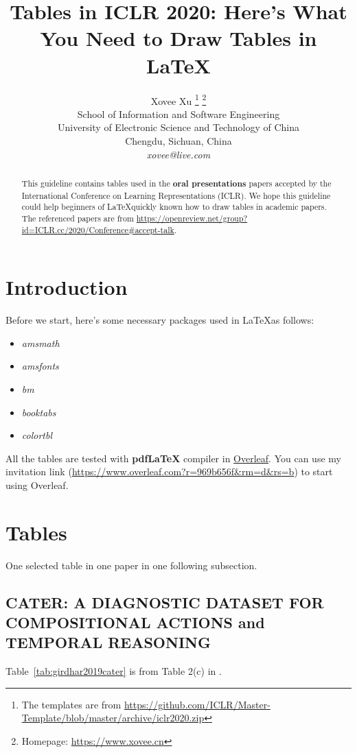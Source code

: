 \documentclass{article} %
\title{Tables in ICLR 2020: Here's What You Need to Draw Tables in \LaTeX}
\author{Xovee Xu \thanks{ The templates are from \url{https://github.com/ICLR/Master-Template/blob/master/archive/iclr2020.zip}} \thanks{ Homepage: \url{https://www.xovee.cn}} \\
School of Information and Software Engineering\\
University of Electronic Science and Technology of China\\
Chengdu, Sichuan, China\\
\textit{xovee@live.com} \\
}
\begin{document}
\maketitle

\begin{abstract}
This guideline contains tables used in the \textbf{oral presentations} papers accepted by the International Conference on Learning Representations (ICLR). We hope this guideline could help beginners of \LaTeX quickly known how to draw tables in academic papers. The referenced papers are from \url{https://openreview.net/group?id=ICLR.cc/2020/Conference#accept-talk}. 
\end{abstract}

\section{Introduction}\label{sec:introduction}

Before we start, here's some necessary packages used in \LaTeX as follows:
\begin{itemize}
    \item \textit{amsmath}
    \item \textit{amsfonts}
    \item \textit{bm}
    \item \textit{booktabs}
    \item \textit{colortbl}
\end{itemize}

All the tables are tested with \textbf{pdfLaTeX} compiler in \hyperlink{https://www.overleaf.com/}{Overleaf}. You can use my invitation link (\url{https://www.overleaf.com?r=969b656f&rm=d&rs=b}) to start using Overleaf. 

\section{Tables}\label{sec:tables}

One selected table in one paper in one following subsection. 

\subsection{CATER: A DIAGNOSTIC DATASET FOR
COMPOSITIONAL ACTIONS and TEMPORAL REASONING}

Table~\ref{tab:girdhar2019cater} is from Table 2(c) in \cite{girdhar2019cater}. 
\end{document}
